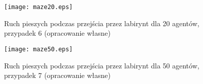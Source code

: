 \begin{figure}
\label{figure:siatka}
\centering
\texttt{[image: maze20.eps]}
\caption{Ruch pieszych podczas przejścia przez labirynt dla 20 agentów, przypadek 6 (opracowanie własne)}
\end{figure}


\begin{figure}
\label{figure:siatka}
\centering
\texttt{[image: maze50.eps]}
\caption{Ruch pieszych podczas przejścia przez labirynt dla 50 agentów, przypadek 7 (opracowanie własne)}
\end{figure}

